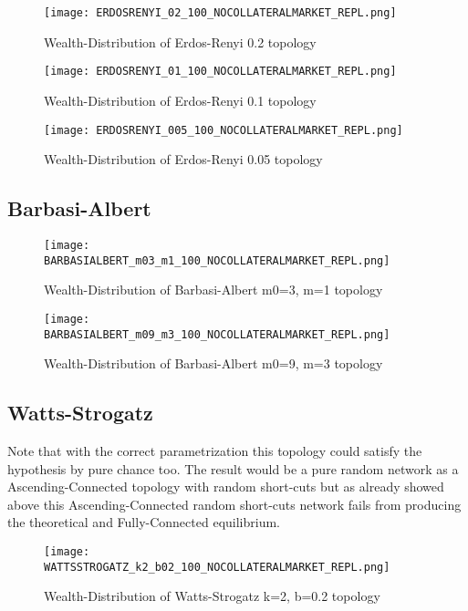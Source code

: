 \documentclass[Bachelorarbeit.tex]{subfiles}
\begin{document}
\begin{figure}[H]
	\centering
  \texttt{[image: ERDOSRENYI\_02\_100\_NOCOLLATERALMARKET\_REPL.png]}
	\caption{Wealth-Distribution of Erdos-Renyi 0.2 topology}
	\label{fig:wealth_ERDOSRENYI_02_100_NOCOLLATERALMARKET_REPL}
\end{figure}

\begin{figure}[H]
	\centering
  \texttt{[image: ERDOSRENYI\_01\_100\_NOCOLLATERALMARKET\_REPL.png]}
	\caption{Wealth-Distribution of Erdos-Renyi 0.1 topology}
	\label{fig:wealth_ERDOSRENYI_01_100_NOCOLLATERALMARKET_REPL}
\end{figure}

\begin{figure}[H]
	\centering
  \texttt{[image: ERDOSRENYI\_005\_100\_NOCOLLATERALMARKET\_REPL.png]}
	\caption{Wealth-Distribution of Erdos-Renyi 0.05 topology}
	\label{fig:wealth_ERDOSRENYI_005_100_NOCOLLATERALMARKET_REPL}
\end{figure}

\subsection{Barbasi-Albert}
\begin{figure}[H]
	\centering
  \texttt{[image: BARBASIALBERT\_m03\_m1\_100\_NOCOLLATERALMARKET\_REPL.png]}
	\caption{Wealth-Distribution of Barbasi-Albert m0=3, m=1 topology}
	\label{fig:wealth_BARBASIALBERT_m03_m1_100_NOCOLLATERALMARKET_REPL}
\end{figure}

\begin{figure}[H]
	\centering
  \texttt{[image: BARBASIALBERT\_m09\_m3\_100\_NOCOLLATERALMARKET\_REPL.png]}
	\caption{Wealth-Distribution of Barbasi-Albert m0=9, m=3 topology}
	\label{fig:wealth_BARBASIALBERT_m09_m3_100_NOCOLLATERALMARKET_REPL}
\end{figure}

\subsection{Watts-Strogatz}
Note that with the correct parametrization this topology could satisfy the hypothesis by pure chance too. The result would be a pure random network as a Ascending-Connected topology with random short-cuts but as already showed above this Ascending-Connected random short-cuts network fails from producing the theoretical and Fully-Connected equilibrium.

\begin{figure}[H]
	\centering
  \texttt{[image: WATTSSTROGATZ\_k2\_b02\_100\_NOCOLLATERALMARKET\_REPL.png]}
	\caption{Wealth-Distribution of Watts-Strogatz k=2, b=0.2 topology}
	\label{fig:wealth_WATTSSTROGATZ_k2_b02_100_NOCOLLATERALMARKET_REPL}
\end{figure}
\end{document}

